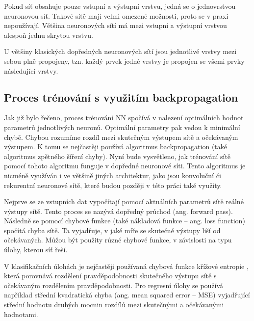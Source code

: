 Pokud síť obsahuje pouze vstupní a výstupní vrstvu, jedná se o jednovrstvou
neuronovou síť. Takové sítě mají velmi omezené možnosti, proto se v praxi
nepoužívají. Většina neuronových sítí má mezi vstupní a výstupní vrstvou
alespoň jednu skrytou vrstvu.%

U většiny klasických dopředných neuronových sítí jsou jednotlivé vrstvy mezi
sebou plně propojeny, tzn. každý prvek jedné vrstvy je propojen se všemi prvky
následující vrstvy.


\subsection{Proces trénování s využitím backpropagation}

Jak již bylo řečeno, proces trénování NN spočívá v nalezení optimálních hodnot
parametrů jednotlivých neuronů. Optimální parametry pak vedou k minimální
chybě. Chybou rozumíme rozdíl mezi skutečným výstupem sítě a očekávaným
výstupem. K tomu se nejčastěji používá algoritmus backpropagation (také
algoritmus zpětného šíření chyby). Nyní bude vysvětleno, jak trénování sítě
pomocí tohoto algoritmu funguje v dopředné neuronové síti. Tento algoritmus je
nicméně využíván i ve většině jiných architektur, jako jsou konvoluční či
rekurentní neuronové sítě, které budou později v této práci také využity.

Nejprve se ze vstupních dat vypočítají pomocí aktuálních parametrů sítě reálné
výstupy sítě. Tento proces se nazývá dopředný průchod (ang. forward pass).
Následně se pomocí chybové funkce (také nákladová funkce – ang. loss function)
spočítá chyba sítě. Ta vyjadřuje, v jaké míře se skutečné výstupy liší od
očekávaných. Můžou být použity různé chybové funkce, v závislosti na typu
úlohy, kterou síť řeší.

V klasifikačních úlohách je nejčastěji používaná chybová funkce křížové
entropie \cite{crossentropy}, která porovnává rozdělení pravděpodobnosti
skutečného výstupu sítě s očekávaným rozdělením pravděpodobnosti. Pro regresní
úlohy se používá například střední kvadratická chyba (ang. mean squared error –
MSE) \cite{mse} vyjadřující střední hodnotu druhých mocnin rozdílů mezi
skutečnými a očekávanými hodnotami.

